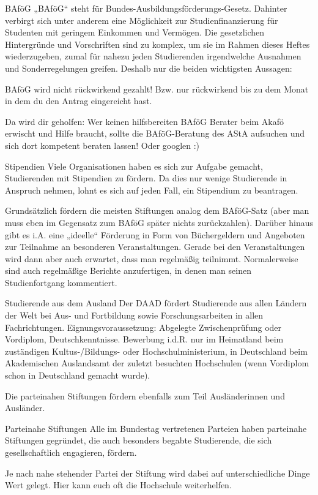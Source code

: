 BAföG
„BAföG“ steht für Bundes-Ausbildungsförderungs-Gesetz. Dahinter verbirgt sich unter anderem eine Möglichkeit zur Studienfinanzierung für Studenten mit geringem Einkommen und Vermögen. Die gesetzlichen Hintergründe und Vorschriften sind zu komplex, um sie im Rahmen dieses Heftes wiederzugeben, zumal für nahezu jeden Studierenden irgendwelche Ausnahmen und Sonderregelungen greifen. Deshalb nur die beiden wichtigsten Aussagen:

BAföG wird nicht rückwirkend gezahlt! Bzw. nur rückwirkend bis zu dem Monat in dem du den Antrag eingereicht hast.

Da wird dir geholfen: Wer keinen hilfsbereiten BAföG Berater beim Akafö erwischt und Hilfe braucht, sollte die BAföG-Beratung des AStA aufsuchen und sich dort kompetent beraten lassen!
Oder googlen :)

Stipendien
Viele Organisationen haben es sich zur Aufgabe gemacht, Studierenden mit Stipendien zu fördern. Da dies nur wenige Studierende in Anspruch nehmen, lohnt es sich auf jeden Fall, ein Stipendium zu beantragen.

Grundsätzlich fördern die meisten Stiftungen analog dem BAföG-Satz (aber man muss eben im Gegensatz zum BAföG später nichts zurückzahlen). Darüber hinaus gibt es i.A. eine „ideelle“ Förderung in Form von Büchergeldern und Angeboten zur Teilnahme an besonderen Veranstaltungen. Gerade bei den Veranstaltungen wird dann aber auch erwartet, dass man regelmäßig teilnimmt. Normalerweise sind auch regelmäßige Berichte anzufertigen, in denen man seinen Studienfortgang kommentiert.

Studierende aus dem Ausland
Der DAAD fördert Studierende aus allen Ländern der Welt bei Aus- und Fortbildung sowie Forschungsarbeiten in allen Fachrichtungen. Eignungsvoraussetzung: Abgelegte Zwischenprüfung oder Vordiplom, Deutschkenntnisse. Bewerbung i.d.R. nur im Heimatland beim zuständigen Kultus-/Bildungs- oder Hochschulministerium, in Deutschland beim Akademischen Auslandsamt der zuletzt besuchten Hochschulen (wenn Vordiplom schon in Deutschland gemacht wurde).

Die parteinahen Stiftungen fördern ebenfalls zum Teil Ausländerinnen und Ausländer.

Parteinahe Stiftungen
Alle im Bundestag vertretenen Parteien haben parteinahe Stiftungen gegründet, die auch besonders begabte Studierende, die sich gesellschaftlich engagieren, fördern.

Je nach nahe stehender Partei der Stiftung wird dabei auf unterschiedliche Dinge Wert gelegt. Hier kann euch oft die Hochschule weiterhelfen.

